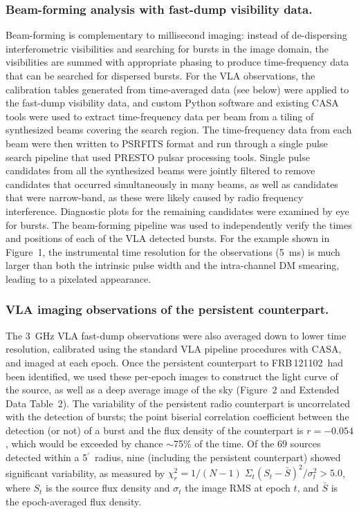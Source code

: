 \documentclass{nature_frb}
\newcommand{\frb}{FRB\,121102}
\newcommand{\arcmin}{\ensuremath{^{\prime}}}
\begin{document}
\subsubsection*{Beam-forming analysis with fast-dump visibility data.}
Beam-forming is complementary to millisecond imaging: instead of de-dispersing interferometric visibilities and searching for bursts in the image domain, the visibilities are summed with appropriate phasing to produce time-frequency data that can be searched for dispersed bursts. For the VLA observations, the calibration tables generated from time-averaged data (see below) were applied to the fast-dump visibility data, and custom Python software and existing CASA tools were used to extract time-frequency data per beam from a tiling of synthesized beams covering the search region.  The time-frequency data from each beam were then written to PSRFITS format and run through a single pulse search pipeline that used PRESTO pulsar processing tools.  Single pulse candidates from all the synthesized beams were jointly filtered to remove candidates that occurred simultaneously in many beams, as well as candidates that were narrow-band, as these were likely caused by radio frequency interference.  Diagnostic plots for the remaining candidates were examined by eye for bursts. The beam-forming pipeline was used to independently verify the times and positions of each of the VLA detected bursts.
For the example shown in Figure~1, the instrumental time resolution for the observations (5~ms) is much larger than both the intrinsic pulse width and the intra-channel DM smearing, leading to a pixelated appearance.

\subsubsection*{VLA imaging observations of the persistent counterpart.}
The 3~GHz VLA fast-dump observations were also averaged down to lower time resolution, calibrated using the standard VLA pipeline procedures with CASA\cite{casa}, and imaged at each epoch. Once the persistent counterpart to \frb\ had been identified, we used these per-epoch images to construct the light curve of the source, as well as a deep average image of the sky (Figure~2 and Extended Data Table~2).  The variability of the persistent radio counterpart is uncorrelated with the detection of bursts; the point biserial correlation coefficient between the detection (or not) of a burst and the flux density of the counterpart is $r=-0.054$, which would be exceeded by chance $\sim$75\% of the time. Of the 69 sources detected within a 5\arcmin\ radius, nine (including the persistent counterpart) showed significant variability, as measured by
$\chi^2_r = 1/(N-1) \; \Sigma_t (S_t - \bar{S})^2/\sigma_t^2 > 5.0$, where $S_t$ is the source flux density and $\sigma_t$ the image RMS at epoch $t$, and $\bar{S}$ is the epoch-averaged flux density.
\end{document}
